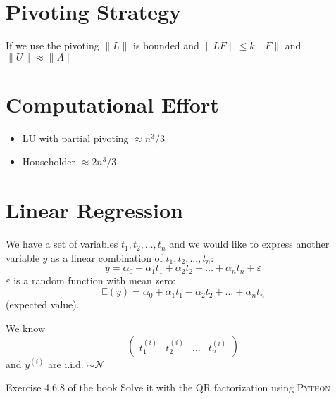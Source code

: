 \section*{Pivoting Strategy}

If we use the pivoting $\|L\|$ is bounded and $\|LF\| \leq k\|F\|$ and $\|U\| \approx \|A\|$

\section*{Computational Effort}

\begin{itemize}
\item LU with partial pivoting $\approx n^3/3$
\item Householder $\approx 2n^3/3$
\end{itemize}

\section{Linear Regression}





We have a set of variables $t_1, t_2, \ldots, t_n$ and we would like to express another variable $y$ as a linear combination of $t_1, t_2, \ldots, t_n$:
\[
y = \alpha_0 + \alpha_1 t_1 + \alpha_2 t_2 + \ldots + \alpha_n t_n + \varepsilon
\]
$\varepsilon$ is a random function with mean zero:
\[
\mathbb{E}(y) = \alpha_0 + \alpha_1 t_1 + \alpha_2 t_2 + \ldots + \alpha_n t_n
\]
(expected value).

We know
\[
\begin{pmatrix}
t_1^{(i)} & t_2^{(i)} & \ldots & t_n^{(i)}
\end{pmatrix}
\]
and $y^{(i)}$ are i.i.d. $\sim \mathcal{N}$

\begin{mdframed}[backgroundcolor=blue!20]
Exercise 4.6.8 of the book
Solve it with the QR factorization using \textsc{Python}
\end{mdframed}
